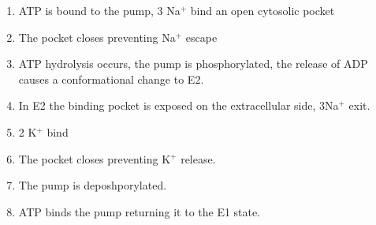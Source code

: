 \documentclass[11pt]{scrartcl}
\begin{document}
\begin{enumerate}
\item\label{item:2} ATP is bound to the pump, 3 Na$^{+}$ bind an open
  cytosolic pocket
\item The pocket closes preventing Na$^{+}$ escape
\item ATP hydrolysis occurs, the pump is phosphorylated, the release
  of ADP causes a conformational change to E2.
\item In E2 the binding pocket is exposed on the extracellular side,
  3Na$^{+}$ exit.
\item 2 K$^{+}$ bind
\item The pocket closes preventing K$^{+}$ release.
\item The pump is deposhporylated.
\item ATP binds the pump returning it to the E1 state.
\end{enumerate}
\end{document}
